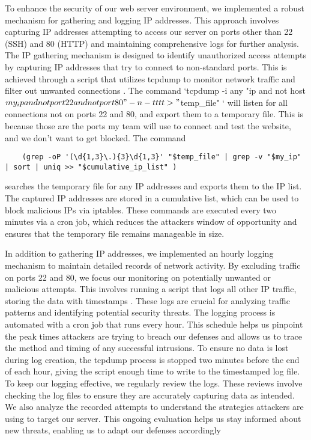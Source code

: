 To enhance the security of our web server environment, we implemented a robust mechanism for gathering and logging IP addresses. This approach involves capturing IP addresses attempting 
to access our server on ports other than 22 (SSH) and 80 (HTTP) and maintaining comprehensive logs for further analysis. The IP gathering mechanism is designed to identify unauthorized access 
attempts by capturing IP addresses that try to connect to non-standard ports. This is achieved through a script that utilizes tcpdump to monitor network traffic and filter out unwanted connections \cite{TechTarget_Net}. 
The command  `tcpdump -i any "ip and not host $my_ip and not port 22 and not port 80" -n -tttt > "$temp_file" ` will listen for all connections not on ports 22 and 80, and export them to a temporary file. This is because those are the ports my team will use to connect and test the website, and we don't want to get blocked.   
The command \begin{verbatim}
    (grep -oP '(\d{1,3}\.){3}\d{1,3}' "$temp_file" | grep -v "$my_ip" | sort | uniq >> "$cumulative_ip_list" )
    \end{verbatim}
searches the temporary file for any IP addresses and exports them to the IP list.   
The captured IP addresses are stored in a cumulative list, which can be used to block malicious IPs via iptables. These commands are executed every two minutes via a cron job, which reduces the attackers window of opportunity and ensures that the temporary file remains manageable in size.

In addition to gathering IP addresses, we implemented an hourly logging mechanism to maintain detailed records of network activity. By excluding traffic on ports 22 and 80, we focus our monitoring on potentially unwanted or malicious attempts.
This involves running a script that logs all other IP traffic, storing the data with timestamps \cite{Schwartz_TCPDUMP}. These logs are crucial for analyzing traffic patterns and identifying potential security threats. 
The logging process is automated with a cron job that runs every hour. This schedule helps us pinpoint the peak times attackers are trying to breach our defenses and allows us to trace the method and timing of any successful intrusions.
To ensure no data is lost during log creation, the tcpdump process is stopped two minutes before the end of each hour, giving the script enough time to write to the timestamped log file.
To keep our logging effective, we regularly review the logs. These reviews involve checking the log files to ensure they are accurately capturing data as intended. We also analyze the recorded attempts to understand the strategies attackers are using to target our server. 
This ongoing evaluation helps us stay informed about new threats, enabling us to adapt our defenses accordingly

